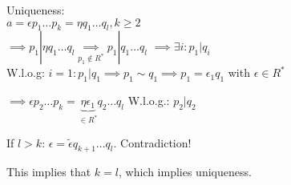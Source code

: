 Uniqueness:\\
$a = \epsilon p_1 \ldots p_k = \eta q_1 \ldots q_l, k\geq 2$\\
$\implies p_1 | \eta q_1 \ldots q_l \underset{p_1 \not\in R^{*}}{\implies}{} p_1 | q_1 \ldots q_l$
$\implies \exists i: p_1 |q_i$ \\ W.l.o.g: $i = 1: p_1|q_1 \implies p_1 \sim q_1 \implies p_1 = \epsilon_1 q_1$ with $\epsilon \in R^{*}$

$\implies\epsilon p_2 \ldots p_k = \underbrace{\eta \epsilon_1}_{\in R^{*}} q_2 \ldots q_l$ W.l.o.g.: $p_2|q_2$

If $l > k$: $\epsilon = \tilde{\epsilon} q_{k+1} \ldots q_l$. Contradiction!

This implies that $k=l$, which implies uniqueness.
